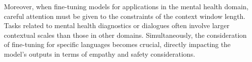 Moreover, when fine-tuning models for applications in the mental health domain, careful attention must be given to the constraints of the context window length. Tasks related to mental health diagnostics or dialogues often involve larger contextual scales than those in other domains. Simultaneously, the consideration of fine-tuning for specific languages becomes crucial, directly impacting the model's outputs in terms of empathy and safety considerations.



